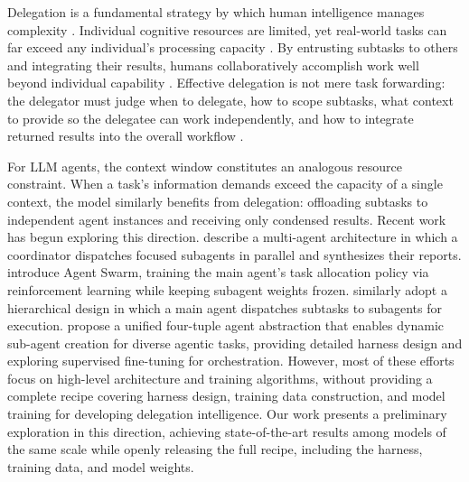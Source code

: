 \documentclass[table]{gtech}
\begin{document}
Delegation is a fundamental strategy by which human intelligence manages complexity \citep{simon2013administrative}. Individual cognitive resources are limited, yet real-world tasks can far exceed any individual's processing capacity \citep{kahneman1973attention}. By entrusting subtasks to others and integrating their results, humans collaboratively accomplish work well beyond individual capability \citep{march1993organizations}. Effective delegation is not mere task forwarding: the delegator must judge when to delegate, how to scope subtasks, what context to provide so the delegatee can work independently, and how to integrate returned results into the overall workflow \citep{castelfranchi1998towards}.

For LLM agents, the context window constitutes an analogous resource constraint. When a task's information demands exceed the capacity of a single context, the model similarly benefits from delegation: offloading subtasks to independent agent instances and receiving only condensed results. Recent work has begun exploring this direction. \citet{anthropic2025multiagent} describe a multi-agent architecture in which a coordinator dispatches focused subagents in parallel and synthesizes their reports. \citet{team2026kimi} introduce Agent Swarm, training the main agent's task allocation policy via reinforcement learning while keeping subagent weights frozen. \citet{huang2026step} similarly adopt a hierarchical design in which a main agent dispatches subtasks to subagents for execution. \citet{ruan2026aorchestra} propose a unified four-tuple agent abstraction that enables dynamic sub-agent creation for diverse agentic tasks, providing detailed harness design and exploring supervised fine-tuning for orchestration. However, most of these efforts focus on high-level architecture and training algorithms, without providing a complete recipe covering harness design, training data construction, and model training for developing delegation intelligence. Our work presents a preliminary exploration in this direction, achieving state-of-the-art results among models of the same scale while openly releasing the full recipe, including the harness, training data, and model weights.
\end{document}
